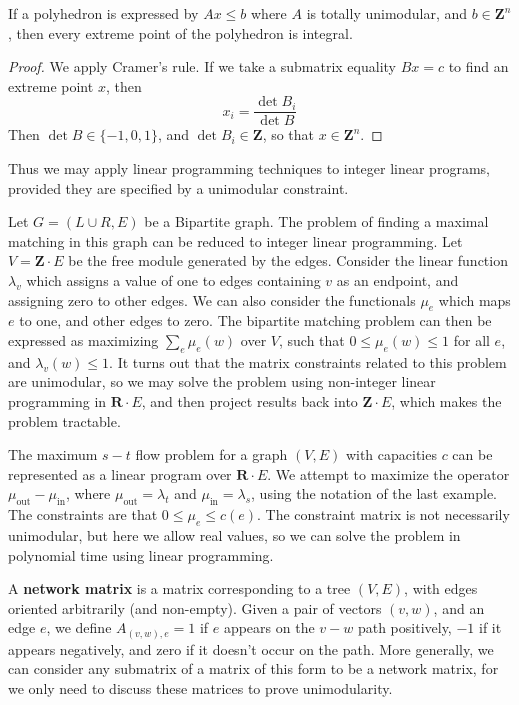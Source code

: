 \begin{theorem}
    If a polyhedron is expressed by $Ax \leq b$ where $A$ is totally unimodular, and $b \in \mathbf{Z}^n$, then every extreme point of the polyhedron is integral.
\end{theorem}
\begin{proof}
    We apply Cramer's rule. If we take a submatrix equality $Bx = c$ to find an extreme point $x$, then
    \[ x_i = \frac{\det B_i}{\det B} \]
    Then $\det B \in \{ -1, 0, 1 \}$, and $\det B_i \in \mathbf{Z}$, so that $x \in \mathbf{Z}^n$.
\end{proof}

Thus we may apply linear programming techniques to integer linear programs, provided they are specified by a unimodular constraint.

\begin{example}
    Let $G = (L \cup R, E)$ be a Bipartite graph. The problem of finding a maximal matching in this graph can be reduced to integer linear programming. Let $V = \mathbf{Z} \cdot E$ be the free module generated by the edges. Consider the linear function $\lambda_v$ which assigns a value of one to edges containing $v$ as an endpoint, and assigning zero to other edges. We can also consider the functionals $\mu_e$ which maps $e$ to one, and other edges to zero. The bipartite matching problem can then be expressed as maximizing $\sum_e \mu_e(w)$ over $V$, such that $0 \leq \mu_e(w) \leq 1$ for all $e$, and $\lambda_v(w) \leq 1$. It turns out that the matrix constraints related to this problem are unimodular, so we may solve the problem using non-integer linear programming in $\mathbf{R} \cdot E$, and then project results back into $\mathbf{Z} \cdot E$, which makes the problem tractable.
\end{example}

\begin{example}
    The maximum $s-t$ flow problem for a graph $(V,E)$ with capacities $c$ can be represented as a linear program over $\mathbf{R} \cdot E$. We attempt to maximize the operator $\mu_{\text{out}} - \mu_{\text{in}}$, where $\mu_{\text{out}} = \lambda_t$ and $\mu_{\text{in}} = \lambda_s$, using the notation of the last example. The constraints are that $0 \leq \mu_e \leq c(e)$. The constraint matrix is not necessarily unimodular, but here we allow real values, so we can solve the problem in polynomial time using linear programming.
\end{example}

A {\bf network matrix} is a matrix corresponding to a tree $(V,E)$, with edges oriented arbitrarily (and non-empty). Given a pair of vectors $(v,w)$, and an edge $e$, we define $A_{(v,w),e} = 1$ if $e$ appears on the $v-w$ path positively, $-1$ if it appears negatively, and zero if it doesn't occur on the path. More generally, we can consider any submatrix of a matrix of this form to be a network matrix, for we only need to discuss these matrices to prove unimodularity.

